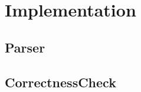 \chapter{Implementation}\label{chapter:implementation}

\par
\par
\par



\section{Parser}

\section{CorrectnessCheck}